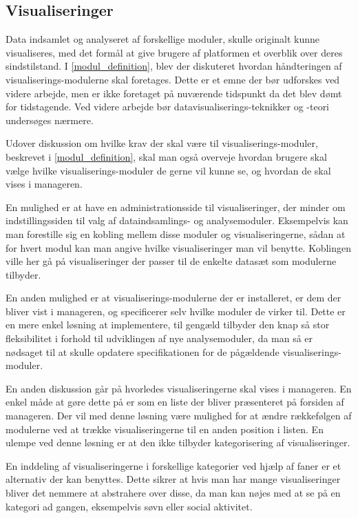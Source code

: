 \subsection{Visualiseringer}
Data indsamlet og analyseret af forskellige moduler, skulle originalt kunne visualiseres, med det formål at give brugere af platformen et overblik over deres sindstilstand.
I \cref{modul_definition}, blev der diskuteret hvordan håndteringen af visualiserings-modulerne skal foretages.
Dette er et emne der bør udforskes ved videre arbejde, men er ikke foretaget på nuværende tidspunkt da det blev dømt for tidstagende.
Ved videre arbejde bør datavisualiserings-teknikker og -teori undersøges nærmere.

Udover diskussion om hvilke krav der skal være til visualiserings-moduler, beskrevet i \cref{modul_definition}, skal man også overveje hvordan brugere skal vælge hvilke visualiserings-moduler de gerne vil kunne se, og hvordan de skal vises i manageren.

En mulighed er at have en administrationsside til visualiseringer, der minder om indstillingssiden til valg af dataindsamlings- og analysemoduler.
Eksempelvis kan man forestille sig en kobling mellem disse moduler og visualiseringerne, sådan at for hvert modul kan man angive hvilke visualiseringer man vil benytte.
Koblingen ville her gå på visualiseringer der passer til de enkelte datasæt som modulerne tilbyder.

En anden mulighed er at visualiserings-modulerne der er installeret, er dem der bliver vist i manageren, og specificerer selv hvilke moduler de virker til.
Dette er en mere enkel løsning at implementere, til gengæld tilbyder den knap så stor fleksibilitet i forhold til udviklingen af nye analysemoduler, da man så er nødsaget til at skulle opdatere specifikationen for de pågældende visualiserings-moduler.

En anden diskussion går på hvorledes visualiseringerne skal vises i manageren.
En enkel måde at gøre dette på er som en liste der bliver præsenteret på forsiden af manageren.
Der vil med denne løsning være mulighed for at ændre rækkefølgen af modulerne ved at trække visualiseringerne til en anden position i listen.
En ulempe ved denne løsning er at den ikke tilbyder kategorisering af visualiseringer.

En inddeling af visualiseringerne i forskellige kategorier ved hjælp af faner er et alternativ der kan benyttes.
Dette sikrer at hvis man har mange visualiseringer bliver det nemmere at abstrahere over disse, da man kan nøjes med at se på en kategori ad gangen, eksempelvis søvn eller social aktivitet.


